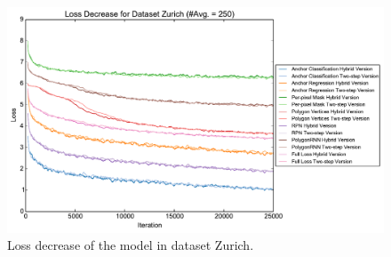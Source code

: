 \begin{figure}[!h]
	\centering
	\includegraphics[width=\fig\textwidth]{4-07.pdf}
    \caption[Loss decrease of the model in dataset Zurich]{Loss decrease of the model in dataset Zurich.}
	\label{fig:losdeczh}
\end{figure}